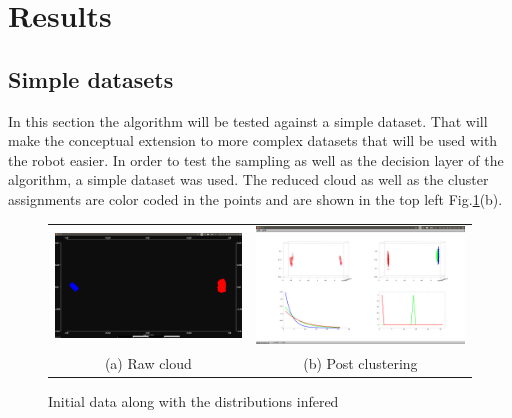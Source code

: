 \documentclass[twoside,hidelinks]{article}
\begin{document}
\section{Results}
\label{sec:results}

\subsection{Simple datasets}

In this section the algorithm will be tested against a simple dataset. That will make the conceptual extension to more complex datasets that will be used with the robot easier. In order to test the sampling as well as the decision layer of the algorithm, a simple dataset was used. The reduced cloud as well as the cluster assignments are color coded in the points and are shown in the top left Fig.\ref{pcl:clust}(b).

\begin{figure}
\begin{tabular}{cc}
  \includegraphics[width=.5\textwidth]{clusterings/initialData} &   \includegraphics[width=.5\textwidth]{clusterings/colorcodedDistributions} \\
(a) Raw cloud  & (b) Post clustering \\[6pt]
\end{tabular}
\caption{Initial data along with the distributions infered}
  \label{pcl:clust}
\end{figure}
\end{document}
